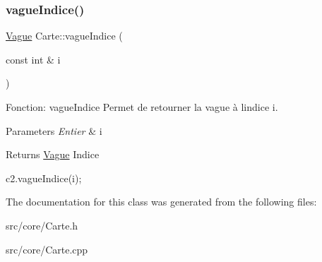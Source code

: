 \subsubsection{\texorpdfstring{vague\+Indice()}{vagueIndice()}}
{\footnotesize\ttfamily \hyperlink{classVague}{Vague} Carte\+::vague\+Indice (\begin{DoxyParamCaption}\item[{const int \&}]{i }\end{DoxyParamCaption})}



Fonction\+: vague\+Indice Permet de retourner la vague à l\textquotesingle{}indice i. 


\begin{DoxyParams}{Parameters}
{\em Entier} & i \\
\hline
\end{DoxyParams}
\begin{DoxyReturn}{Returns}
\hyperlink{classVague}{Vague} Indice 
\begin{DoxyCode}
c2.vagueIndice(i);
\end{DoxyCode}
 
\end{DoxyReturn}


The documentation for this class was generated from the following files\+:\begin{DoxyCompactItemize}
\item 
src/core/Carte.\+h\item 
src/core/Carte.\+cpp\end{DoxyCompactItemize}
